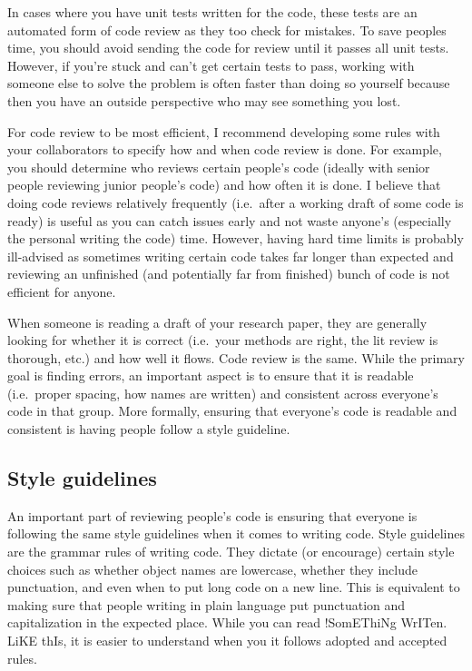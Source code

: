 \documentclass[
  12pt,
]{book}
\begin{document}
In cases where you have unit tests written for the code, these tests are an automated form of code review as they too check for mistakes. To save peoples time, you should avoid sending the code for review until it passes all unit tests. However, if you're stuck and can't get certain tests to pass, working with someone else to solve the problem is often faster than doing so yourself because then you have an outside perspective who may see something you lost.

For code review to be most efficient, I recommend developing some rules with your collaborators to specify how and when code review is done. For example, you should determine who reviews certain people's code (ideally with senior people reviewing junior people's code) and how often it is done. I believe that doing code reviews relatively frequently (i.e.~after a working draft of some code is ready) is useful as you can catch issues early and not waste anyone's (especially the personal writing the code) time. However, having hard time limits is probably ill-advised as sometimes writing certain code takes far longer than expected and reviewing an unfinished (and potentially far from finished) bunch of code is not efficient for anyone.

When someone is reading a draft of your research paper, they are generally looking for whether it is correct (i.e.~your methods are right, the lit review is thorough, etc.) and how well it flows. Code review is the same. While the primary goal is finding errors, an important aspect is to ensure that it is readable (i.e.~proper spacing, how names are written) and consistent across everyone's code in that group. More formally, ensuring that everyone's code is readable and consistent is having people follow a style guideline.

\hypertarget{style-guidelines}{%
\subsection{Style guidelines}\label{style-guidelines}}

An important part of reviewing people's code is ensuring that everyone is following the same style guidelines when it comes to writing code. Style guidelines are the grammar rules of writing code. They dictate (or encourage) certain style choices such as whether object names are lowercase, whether they include punctuation, and even when to put long code on a new line. This is equivalent to making sure that people writing in plain language put punctuation and capitalization in the expected place. While you can read !SomEThiNg WrITen. LiKE thIs, it is easier to understand when you it follows adopted and accepted rules.
\end{document}
